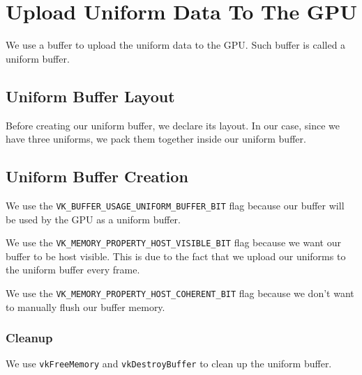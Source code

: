 \section{Upload Uniform Data To The GPU}

We use a buffer to upload the uniform data to the GPU.
Such buffer is called a uniform buffer.

\subsection{Uniform Buffer Layout}

Before creating our uniform buffer, we declare its layout.
In our case, since we have three uniforms, we pack them
together inside our uniform buffer.

\begin{minipage}{\linewidth}{\noindent}
    
\end{minipage}

\subsection{Uniform Buffer Creation}

We use the \texttt{VK\_BUFFER\_USAGE\_UNIFORM\_BUFFER\_BIT} flag because
our buffer will be used by the GPU as a uniform buffer.

We use the \texttt{VK\_MEMORY\_PROPERTY\_HOST\_VISIBLE\_BIT} flag because
we want our buffer to be host visible.
This is due to the fact that we upload our uniforms to the uniform buffer
every frame.

We use the \texttt{VK\_MEMORY\_PROPERTY\_HOST\_COHERENT\_BIT} flag because
we don't want to manually flush our buffer memory.

\begin{minipage}{\linewidth}{\noindent}
    
\end{minipage}

\subsubsection{Cleanup}

We use \texttt{vkFreeMemory} and \texttt{vkDestroyBuffer} to clean up the uniform
buffer.

